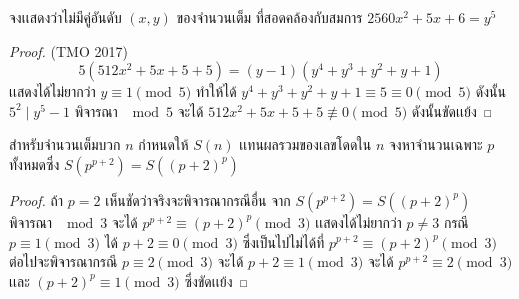 \documentclass[a4paper,12pt]{scrartcl}
\begin{document}
	\begin{example}
		จงเเสดงว่าไม่มีคู่อันดับ $(x,y)$ ของจำนวนเต็ม ที่สอดคล้องกับสมการ $2560x^2+5x+6 = y^5$
	\end{example}
\begin{proof}(TMO 2017)
	\[ 5(512x^2+5x+5+5) = (y-1)(y^4+y^3+y^2+y+1) \] เเสดงได้ไม่ยากว่า  $ y\equiv1 \pmod 5$ ทำให้ได้  $y^4+y^3+y^2+y+1 \equiv 5 \equiv 0 \pmod 5$  ดังนั้น $5^2 \mid y^5-1$ พิจารณา $\mod 5$ จะได้ $512x^2+5x+5+5 \not \equiv 0 \pmod 5$ ดังนั้นขัดเเย้ง
\end{proof}
	\begin{example}
		สำหรับจำนวนเต็มบวก $n$ กำหนดให้ $S(n)$ เเทนผลรวมของเลขโดดใน $n$ จงหาจำนวนเฉพาะ $p$ \\ทั้งหมดซึ่ง $S(p^{p+2})=S((p+2)^p)$
	\end{example}
\begin{proof}
	ถ้า $p =2$ เห็นชัดว่าจริงจะพิจารณากรณีอื่น จาก $S(p^{p+2})=S((p+2)^p)$ พิจารณา $\mod 3$ จะได้ $p^{p+2} \equiv (p+2)^p \pmod 3$ เเสดงได้ไม่ยากว่า $p\neq3$ กรณี $p \equiv 1 \pmod 3 $ ได้ $p+2 \equiv 0 \pmod 3 $ ซึ่งเป็นไปไม่ได้ที่ $p^{p+2} \equiv (p+2)^p \pmod 3$ ต่อไปจะพิจารณากรณี $p \equiv 2 \pmod 3 $ จะได้ $p+2 \equiv 1 \pmod 3 $ จะได้ $p^{p+2} \equiv 2 \pmod 3 $ เเละ $(p+2)^p \equiv 1 \pmod 3 $ ซึ่งขัดเเย้ง
\end{proof}
\end{document}
